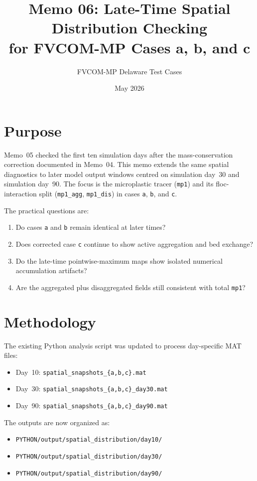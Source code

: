 \documentclass[11pt]{article}
\title{Memo 06: Late-Time Spatial Distribution Checking\\
       for FVCOM-MP Cases a, b, and c}
\author{FVCOM-MP Delaware Test Cases}
\date{May 2026}
\begin{document}
\sloppy
\maketitle

\section*{Purpose}

Memo~05 checked the first ten simulation days after the mass-conservation
correction documented in Memo~04.  This memo extends the same spatial
diagnostics to later model output windows centred on simulation day~30 and
simulation day~90.  The focus is the microplastic tracer (\texttt{mp1}) and
its floc-interaction split (\texttt{mp1\_agg}, \texttt{mp1\_dis}) in cases
\texttt{a}, \texttt{b}, and \texttt{c}.

The practical questions are:
\begin{enumerate}[(1)]
  \item Do cases \texttt{a} and \texttt{b} remain identical at later times?
  \item Does corrected case \texttt{c} continue to show active aggregation and
        bed exchange?
  \item Do the late-time pointwise-maximum maps show isolated numerical
        accumulation artifacts?
  \item Are the aggregated plus disaggregated fields still consistent with
        total \texttt{mp1}?
\end{enumerate}

\section*{Methodology}

The existing Python analysis script was updated to process day-specific MAT
files:
\begin{itemize}
  \item Day~10: \texttt{spatial\_snapshots\_\{a,b,c\}.mat}
  \item Day~30: \texttt{spatial\_snapshots\_\{a,b,c\}\_day30.mat}
  \item Day~90: \texttt{spatial\_snapshots\_\{a,b,c\}\_day90.mat}
\end{itemize}

The outputs are now organized as:
\begin{itemize}
  \item \texttt{PYTHON/output/spatial\_distribution/day10/}
  \item \texttt{PYTHON/output/spatial\_distribution/day30/}
  \item \texttt{PYTHON/output/spatial\_distribution/day90/}
\end{itemize}
\end{document}
